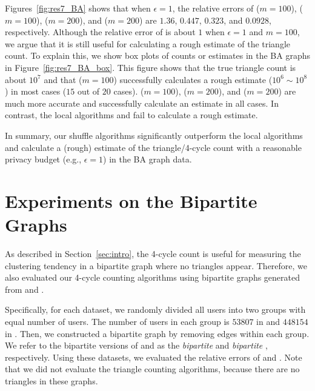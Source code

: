 Figures~\ref{fig:res7_BA} shows that when $\epsilon=1$, the relative errors of \AlgWSTriVR{} ($m=100$), \AlgWSCyc{} ($m=100$), \AlgWSTriVR{} ($m=200$), and \AlgWSCyc{} ($m=200$) are $1.36$, $0.447$, $0.323$, and $0.0928$, respectively.
Although the relative error of \AlgWSTriVR{} is about $1$ when $\epsilon=1$ and $m=100$, we argue that it is still useful for calculating a rough estimate of the triangle count.
To explain this, we show box plots of counts or estimates in the BA graphs in Figure~\ref{fig:res7_BA_box}.
This figure shows that the true triangle count is about $10^7$ and that \AlgWSTriVR{} ($m=100$) successfully calculates a rough estimate ($10^6 \sim 10^8$) in most cases ($15$ out of $20$ cases).
\AlgWSCyc{} ($m=100$), \AlgWSTriVR{} ($m=200$), and \AlgWSCyc{} ($m=200$) are much more accurate and successfully calculate an estimate in all cases.
In contrast, the local algorithms \AlgWLTri{} and \AlgWLCyc{} fail to calculate a rough estimate.

In summary, our shuffle algorithms significantly outperform the local algorithms and calculate a (rough) estimate of the triangle/4-cycle count with a reasonable privacy budget (e.g., $\epsilon=1$) in the BA graph data.

\section{Experiments on the Bipartite Graphs}
\label{sec:bipartite}
As described in Section~\ref{sec:intro}, the 4-cycle count is useful for measuring the clustering tendency in a bipartite graph where no triangles appear.
Therefore, we also evaluated our 4-cycle counting algorithms using bipartite graphs generated from \Gplus{} and \IMDB{}.

Specifically, for each dataset, we randomly divided all users into two groups with equal number of users.
The number of users in each group is $53807$ in \Gplus{} and $448154$ in \IMDB{}.
Then, we constructed a bipartite graph by removing edges within each group.
We refer to the bipartite versions of \Gplus{} and \IMDB{} as the \textit{bipartite \Gplus{}} and \textit{bipartite \IMDB{}}, respectively.
Using these datasets, we evaluated the relative errors of \AlgWSCyc{} and \AlgWLCyc{}.
Note that we did not evaluate the triangle counting algorithms, because there are no triangles in these graphs.


